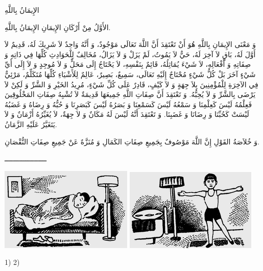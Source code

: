 \documentclass[a5paper]{article}
\begin{document}
الإِيمَانُ بِاللَّهِ

الأَوَّلُ مِنْ أَرْكَانِ الإِيمَانِ الإِيمَانُ بِاللَّهِ.

وَ مَعْنَى الإِيمَانِ بِاللَّهِ هُوَ أَنْ تَعْتَقِدَ أَنَّ اللَّهَ تَعَالَى مَوْجُودٌ، وَ أَنَّهُ وَاحِدٌ لاَ شَرِيكَ لَهُ، قَدِيمٌ لاَ أَوَّلَ لَهُ، بَاقٍ لاَ آخِرَ لَهُ، حَيٌّ لاَ يَمُوتُ، لَمْ يَزَلْ وَ لاَ يَزَالُ، مُخَالِفٌ لِلْحَوَادِثِ كُلِّهَا فِي ذَاتِهِ وَ صِفَاتِهِ وَ أَفْعَالِهِ، لاَ شَيْءَ يُمَاثِلُهُ، قَائِمٌ بِنَفْسِهِ، لاَ يَحْتَاجُ إِلَى مَحَلٍّ وَ لاَ مُوجِدٍ وَ لاَ إِلَى أَيِّ شَيْءٍ آخَرَ بَلْ كُلُّ شَيْءٍ مُحْتَاجٌ إِلَيْهِ تَعَالَى، سَمِيعٌ، بَصِيرٌ، عَالِمٌ لِلَأَشْيَاءِ كُلِّهَا مُتَكَلِّمٌ، مَرْئِيٌّ فِي الآخِرَةِ لِلْمُؤْمِنِينَ بِلاَ جِهَةٍ وَ لاَ كَيْفٍ، قَادِرٌ عَلَى كُلِّ شَيْءٍ، مُرِيدُ الخَيْرِ وَ الشَّرِّ وَ لَكِنْ لاَ يَرْضَى بِالشَّرِّ وَ لاَ يُحِبُّهُ. وَ تَعْتَقِدَ أَنَّ صِفَاتِ اللَّهِ جَمِيعَهَا قَدِيمَةٌ لاَ تُشْبِهُ صِفَاتِ المَخْلُوقِينَ فَعِلْمُهُ لَيْسَ كَعِلْمِنَا وَ سَمْعُهُ لَيْسَ كَسَمْعِنَا وَ بَصَرُهُ لَيْسَ كَبَصَرِنَا وَ حُبُّهُ وَ رِضَاهُ وَ غَضَبُهُ لَيْسَتْ كَحُبِّنَا وَ رِضَانَا وَ غَضَبِنَا. وَ تَعْتَقِدَ أَنَّهُ لَيْسَ لَهُ مَكَانٌ وَ لاَ جِهَةٌ، لاَ يُغَيِّرُهُ أَزْمَانٌ وَ لاَ يَتَغَيَّرُ عَلَيْهِ الزَّمَانُ.

وَ خُلاَصَةُ القَوْلِ إِنَّ اللَّهَ مَوْصُوفٌ بِجَمِيعِ صِفَاتِ الكَمَالِ وَ مُنَزَّهٌ عَنْ جَمِيعِ صِفَاتِ النُّقْصَانِ.

ــــــــــــــــــــ

 \includegraphics[width=2.5in,height=1.5728in]{MuhammadBagauddinlatinized-img339.png}   \includegraphics[width=2.4791in,height=1.552in]{MuhammadBagauddinlatinized-img340.png} 

1) 2)
\end{document}
